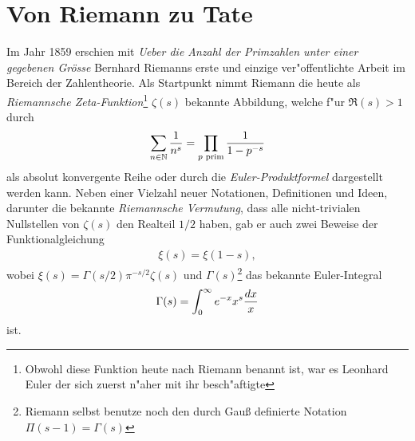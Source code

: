 
\section{Von Riemann zu Tate}
	Im Jahr 1859 erschien mit \emph{\glqq Ueber die Anzahl der Primzahlen unter einer gegebenen Grösse\grqq} Bernhard Riemanns erste und einzige ver"offentlichte Arbeit im Bereich der Zahlentheorie.
	Als Startpunkt nimmt Riemann die heute als \emph{Riemannsche Zeta-Funktion}\footnote{Obwohl diese Funktion heute nach Riemann benannt ist, war es Leonhard Euler der sich zuerst n"aher mit ihr besch"aftigte } $\zeta(s)$ bekannte Abbildung, welche f"ur $\Re(s)>1$ durch
	\begin{align*}
		\sum_{n\in \mathbb{N}} \frac{1}{n^s} = \prod_{p \text{ prim}} \frac{1}{1-p^{-s}}
	\end{align*}
	als absolut konvergente Reihe oder durch die \emph{Euler-Produktformel} dargestellt werden kann.
	Neben einer Vielzahl neuer Notationen, Definitionen und Ideen, darunter die bekannte \emph{Riemannsche Vermutung}, dass alle nicht-trivialen Nullstellen von $\zeta(s)$ den Realteil $1/2$ haben, gab er auch zwei Beweise der Funktionalgleichung
	\begin{align*}
		\xi(s) = \xi(1-s),
	\end{align*}
	wobei $\xi(s) = \Gamma(s/2)\pi^{-s/2}\zeta(s)$ und $\Gamma(s)$\footnote{Riemann selbst benutze noch den durch Gauß definierte Notation $\Pi(s-1)=\Gamma(s)$} das bekannte Euler-Integral
	\begin{align*}
		\Gamma(s) = \int_0^\infty e^{-x} x^s \frac{d{x}}{x}
	\end{align*}
	ist.
	
